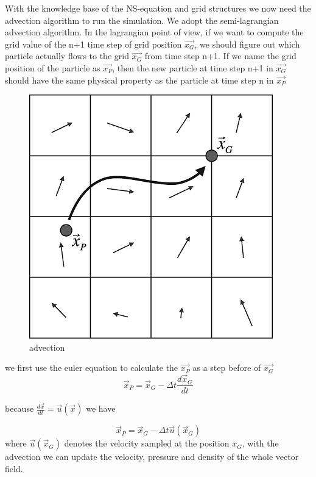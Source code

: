 \documentclass[a4paper,12pt,twoside]{report}
\begin{document}
With the knowledge base of the NS-equation and grid structures we now need the advection algorithm to run the simulation. We adopt the semi-lagrangian advection algorithm. In the lagrangian point of view, if we want to compute the grid value of the n+1 time step of grid position $\vec{x_G}$, we should figure out which particle actually flows to the grid $\vec{x_G}$ from time step n+1. If we name the grid position of the particle as $\vec{x_P}$, then the new particle at time step n+1 in $\vec{x_G}$ should have the same physical property as the particle at time step n in $\vec{x_P}$

\begin{figure}[h]
\centering
\includegraphics[scale=0.5]{advection.png}
\caption{advection\cite{semi}}
\end{figure}

we first use the euler equation to calculate the $\vec{x_P}$ as a step before of $\vec{x_G}$
\begin{equation}
\vec x_P=\vec x_G-\Delta t\frac{d\vec x_G}{dt}
\end{equation}

because $\frac{d\vec x}{dt}=\vec u(\vec x)$ we have

\begin{equation}
\vec x_P=\vec x_G-\Delta t\vec u(\vec x_G)
\end{equation}
where $\vec u(\vec x_G)$ denotes the velocity sampled at the position $x_G$, with the advection we can update the velocity, pressure and density of the whole vector field.
\end{document}
